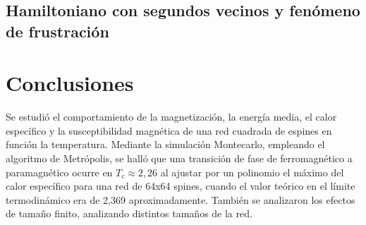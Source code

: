 \documentclass[%
 reprint,
 amsmath,amssymb,
 aps,
spanish]{revtex4-1}
\begin{document}
\subsection{Hamiltoniano con segundos vecinos y fenómeno de frustración}


\section{Conclusiones}

Se estudió el comportamiento de la magnetización,
la energía media, el calor específico y la susceptibilidad
magnética de una red cuadrada de espines en función
la temperatura. Mediante la simulación Montecarlo,
empleando el algoritmo de Metrópolis, se halló que una
transición de fase de ferromagnético a paramagnético
ocurre en $T_c\approx2,26$ al ajustar por un polinomio el máximo del calor específico para una red de 64x64 spines, cuando el valor teórico en el límite termodinámico
era de 2,369 aproximadamente. También se analizaron los
efectos de tamaño finito, analizando distintos tamaños
de la red.
\end{document}
